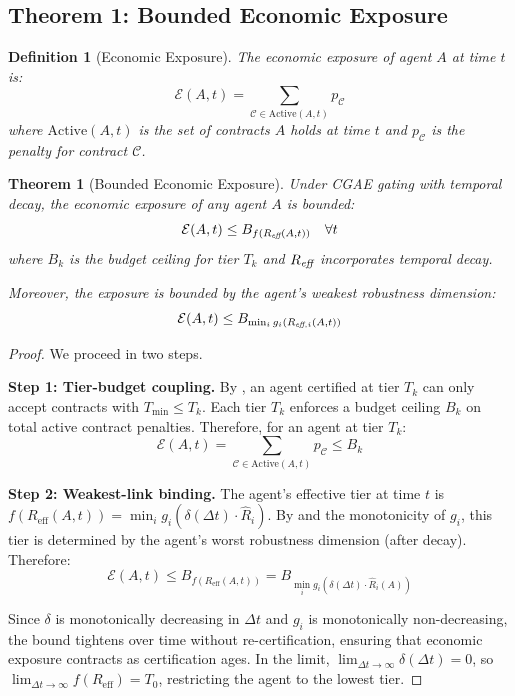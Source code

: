 \documentclass[11pt,a4paper]{article}
\newtheorem{theorem}{Theorem}
\newtheorem{definition}{Definition}
\begin{document}
\subsection{Theorem 1: Bounded Economic Exposure}

\begin{definition}[Economic Exposure]
The \emph{economic exposure} of agent $A$ at time $t$ is:
\begin{equation}
  \mathcal{E}(A, t) = \sum_{\mathcal{C} \in \text{Active}(A,t)} p_{\mathcal{C}}
\end{equation}
where $\text{Active}(A, t)$ is the set of contracts $A$ holds at time $t$ and $p_{\mathcal{C}}$ is the penalty for contract $\mathcal{C}$.
\end{definition}

\begin{theorem}[Bounded Economic Exposure]
\label{thm:bounded}
Under CGAE gating with temporal decay, the economic exposure of any agent $A$ is bounded:
\begin{equation}
  \mathcal{E}(A, t) \leq B_{f(R_{\emph{eff}}(A,t))} \quad \forall t
\end{equation}
where $B_k$ is the budget ceiling for tier $T_k$ and $R_{\emph{eff}}$ incorporates temporal decay.

Moreover, the exposure is bounded by the agent's \emph{weakest} robustness dimension:
\begin{equation}
  \mathcal{E}(A, t) \leq B_{\min_i g_i(R_{\emph{eff},i}(A,t))}
\end{equation}
\end{theorem}

\begin{proof}
We proceed in two steps.

\textbf{Step 1: Tier-budget coupling.} By , an agent certified at tier $T_k$ can only accept contracts with $T_{\min} \leq T_k$. Each tier $T_k$ enforces a budget ceiling $B_k$ on total active contract penalties. Therefore, for an agent at tier $T_k$:
\begin{equation}
  \mathcal{E}(A, t) = \sum_{\mathcal{C} \in \text{Active}(A,t)} p_{\mathcal{C}} \leq B_k
\end{equation}

\textbf{Step 2: Weakest-link binding.} The agent's effective tier at time $t$ is $f(R_{\text{eff}}(A,t)) = \min_i g_i(\delta(\Delta t) \cdot \hat{R}_i)$. By  and the monotonicity of $g_i$, this tier is determined by the agent's worst robustness dimension (after decay). Therefore:
\begin{equation}
  \mathcal{E}(A, t) \leq B_{f(R_{\text{eff}}(A,t))} = B_{\min_i g_i(\delta(\Delta t) \cdot \hat{R}_i(A))}
\end{equation}

Since $\delta$ is monotonically decreasing in $\Delta t$ and $g_i$ is monotonically non-decreasing, the bound tightens over time without re-certification, ensuring that economic exposure contracts as certification ages. In the limit, $\lim_{\Delta t \to \infty} \delta(\Delta t) = 0$, so $\lim_{\Delta t \to \infty} f(R_{\text{eff}}) = T_0$, restricting the agent to the lowest tier.
\end{proof}
\end{document}

